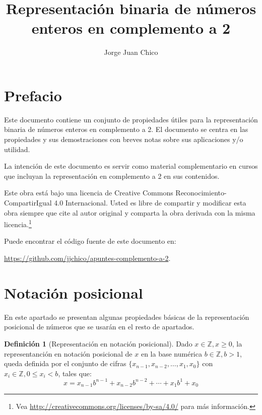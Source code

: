 \documentclass[spanish,a4paper,12pt,titlepage]{article}
\title{Representación binaria de números enteros en complemento a 2}
\author{Jorge Juan Chico}
\affil{\textit{jjchico@dte.us.es}}
\affil{Departamento de Tecnología Electrónica. Universidad de Sevilla}
\theoremstyle{definition}
\newtheorem{definition}{Definición}%
\theoremstyle{remark}
\newcommand{\bbZ}{\mathbb{Z}}
\begin{document}
\maketitle
\newpage
\tableofcontents
\newpage

\section*{Prefacio}

Este documento contiene un conjunto de propiedades útiles para la representación binaria de números enteros en complemento a 2. El documento se centra en las propiedades y sus demostraciones con breves notas sobre sus aplicaciones y/o utilidad.

La intención de este documento es servir como material complementario en cursos que incluyan la representación en complemento a 2 en sus contenidos.

Este obra está bajo una licencia de Creative Commons Reconocimiento-CompartirIgual 4.0 Internacional. Usted es libre de compartir y modificar esta obra siempre que cite al autor original y comparta la obra derivada con la misma licencia.\footnote{
Vea \url{http://creativecommons.org/licenses/by-sa/4.0/} para más información.
}

Puede encontrar el código fuente de este documento en:

\url{https://github.com/jjchico/apuntes-complemento-a-2}.

\section{Notación posicional}

En este apartado se presentan algunas propiedades básicas de la representación posicional de números que se usarán en el resto de apartados.

\begin{definition}[Representación en notación posicional]
 Dado $x \in \bbZ, x \ge 0$, la representanción en notación posicional
 de $x$ en la base numérica $b \in \bbZ, b > 1$, queda definida por el
 conjunto de cifras $\{x_{n-1}, x_{n-2}, \ldots, x_1, x_0\}$ con $x_i \in
 \bbZ, 0 \le x_i < b$, tales que:
  \[
    x = x_{n-1} b^{n-1}+x_{n-2} b^{n-2}+ \cdots + x_1 b^1+x_0
  \]
\end{definition}
\end{document}
